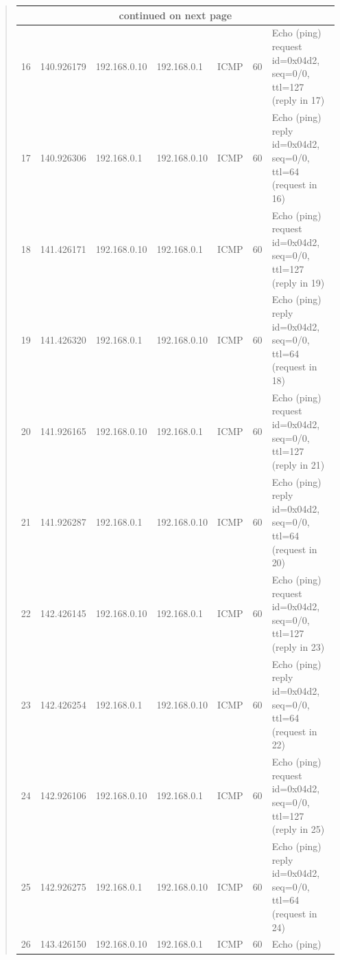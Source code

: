 \documentclass{article}
\newenvironment{ans}
{\fbox{Answer}\begin{quote}\nopagebreak}
{\end{quote}}
\newcommand\INFOCOLSIZE{13em}
\begin{document}
\begin{ans}
\begin{center}
\begin{longtable}{|l|l|l|l|l|l|p{\INFOCOLSIZE}|}
\hline
\multicolumn{7}{|c|}{{continued on next page}}                                                                 \\
\hline
\endfoot

\hline
\hline
\endlastfoot

16 & 140.926179 & 192.168.0.10 & 192.168.0.1 & ICMP & 60 & Echo (ping)
request id=0x04d2, seq=0/0, ttl=127 (reply in 17)                                                              \\
17 & 140.926306 & 192.168.0.1 & 192.168.0.10 & ICMP & 60 & Echo (ping)
reply id=0x04d2, seq=0/0, ttl=64 (request in 16)                                                               \\
18 & 141.426171 & 192.168.0.10 & 192.168.0.1 & ICMP & 60 & Echo (ping)
request id=0x04d2, seq=0/0, ttl=127 (reply in 19)                                                              \\
19 & 141.426320 & 192.168.0.1 & 192.168.0.10 & ICMP & 60 & Echo (ping)
reply id=0x04d2, seq=0/0, ttl=64 (request in 18)                                                               \\
20 & 141.926165 & 192.168.0.10 & 192.168.0.1 & ICMP & 60 & Echo (ping)
request id=0x04d2, seq=0/0, ttl=127 (reply in 21)                                                              \\
21 & 141.926287 & 192.168.0.1 & 192.168.0.10 & ICMP & 60 & Echo (ping)
reply id=0x04d2, seq=0/0, ttl=64 (request in 20)                                                               \\
22 & 142.426145 & 192.168.0.10 & 192.168.0.1 & ICMP & 60 & Echo (ping)
request id=0x04d2, seq=0/0, ttl=127 (reply in 23)                                                              \\
23 & 142.426254 & 192.168.0.1 & 192.168.0.10 & ICMP & 60 & Echo (ping)
reply id=0x04d2, seq=0/0, ttl=64 (request in 22)                                                               \\
24 & 142.926106 & 192.168.0.10 & 192.168.0.1 & ICMP & 60 & Echo (ping)
request id=0x04d2, seq=0/0, ttl=127 (reply in 25)                                                              \\
25 & 142.926275 & 192.168.0.1 & 192.168.0.10 & ICMP & 60 & Echo (ping)
reply id=0x04d2, seq=0/0, ttl=64 (request in 24)                                                               \\
26 & 143.426150 & 192.168.0.10 & 192.168.0.1 & ICMP & 60 & Echo (ping)

\end{longtable}
\end{center}
\end{ans}
\end{document}
